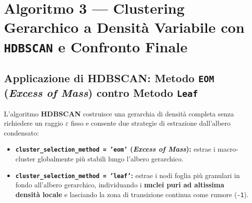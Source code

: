 \begin{table}[H]
\centering
\caption{Profilazione dei Cluster e degli Outlier (\texttt{-1}) individuati da DBSCAN ($\varepsilon = 0,60, \text{min\_samples} = 10$, $N = 20.000$).}
\label{tab:dbscan_profile}
\end{table}

\section{Algoritmo 3 --- Clustering Gerarchico a Densità Variabile con \texttt{HDBSCAN} e Confronto Finale}
\label{sec:hdbscan}

\subsection{Applicazione di HDBSCAN: Metodo \texttt{EOM} (\emph{Excess of Mass}) contro Metodo \texttt{Leaf}}
L'algoritmo \textbf{HDBSCAN} costruisce una gerarchia di densità completa senza richiedere un raggio $\varepsilon$ fisso e consente due strategie di estrazione dall'albero condensato:
\begin{itemize}
    \item \textbf{\texttt{cluster\_selection\_method = 'eom'} (\emph{Excess of Mass}):} estrae i macro-cluster globalmente più stabili lungo l'albero gerarchico.
    \item \textbf{\texttt{cluster\_selection\_method = 'leaf'}:} estrae i nodi foglia più granulari in fondo all'albero gerarchico, individuando i \textbf{nuclei puri ad altissima densità locale} e lasciando la zona di transizione continua come rumore (\texttt{-1}).
\end{itemize}

